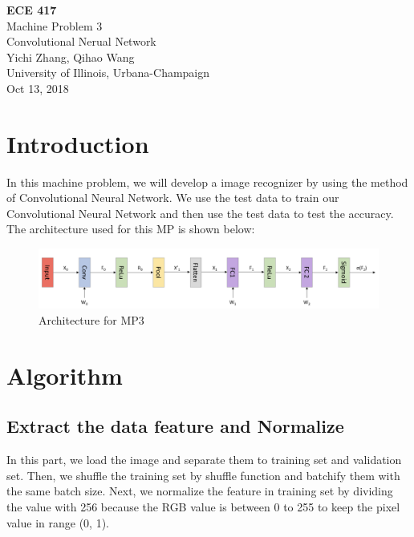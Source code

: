 \documentclass[12pt]{article}
\begin{document}
\begin{titlepage}
	\begin{center}
		\huge{\textbf{ECE 417}} \\
		[0.25in]
		\Large{Machine Problem 3} \\
		[0.1in]
		\large{Convolutional Nerual Network} \\
		[12cm]
		Yichi Zhang, Qihao Wang \\
		[0.5cm]
		University of Illinois, Urbana-Champaign \\
		[0.5cm]
		Oct 13, 2018
	\end{center}
\end{titlepage}

\section{Introduction}
	In this machine problem, we will develop a image recognizer by using the method of Convolutional Neural Network. We use the test data to train our Convolutional Neural Network and then use the test data to test the accuracy. The architecture used for this MP is shown below:
	\begin{figure}[ht]
		\begin{center}
			\includegraphics[width = 13cm]{mp3_1}
		\end{center}
		\caption{Architecture for MP3}
	\end{figure}

\section{Algorithm}
	\subsection*{Extract the data feature and Normalize}
	In this part, we load the image and separate them to training set and validation set. Then, we shuffle the training set by shuffle function and batchify them with the same batch size. Next, we normalize the feature in training set by dividing the value with 256 because the RGB value is between 0 to 255 to keep the pixel value in range (0, 1).
\end{document}
